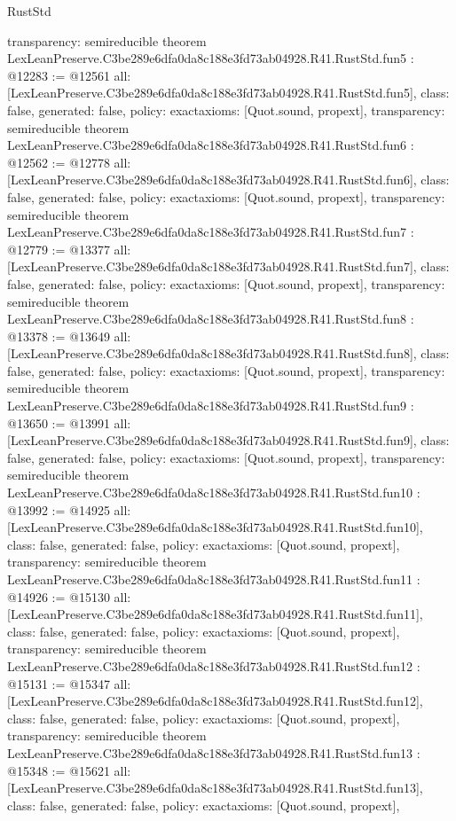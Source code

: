 \begin{lexlean}{RustStd}
\begin{coremodule}
{  transparency: semireducible
}
theorem LexLeanPreserve.C3be289e6dfa0da8c188e3fd73ab04928.R41.RustStd.fun5 : @12283 := @12561 {
  all: [LexLeanPreserve.C3be289e6dfa0da8c188e3fd73ab04928.R41.RustStd.fun5],
  class: false,
  generated: false,
  policy: exact{axioms: [Quot.sound, propext]},
  transparency: semireducible
}
theorem LexLeanPreserve.C3be289e6dfa0da8c188e3fd73ab04928.R41.RustStd.fun6 : @12562 := @12778 {
  all: [LexLeanPreserve.C3be289e6dfa0da8c188e3fd73ab04928.R41.RustStd.fun6],
  class: false,
  generated: false,
  policy: exact{axioms: [Quot.sound, propext]},
  transparency: semireducible
}
theorem LexLeanPreserve.C3be289e6dfa0da8c188e3fd73ab04928.R41.RustStd.fun7 : @12779 := @13377 {
  all: [LexLeanPreserve.C3be289e6dfa0da8c188e3fd73ab04928.R41.RustStd.fun7],
  class: false,
  generated: false,
  policy: exact{axioms: [Quot.sound, propext]},
  transparency: semireducible
}
theorem LexLeanPreserve.C3be289e6dfa0da8c188e3fd73ab04928.R41.RustStd.fun8 : @13378 := @13649 {
  all: [LexLeanPreserve.C3be289e6dfa0da8c188e3fd73ab04928.R41.RustStd.fun8],
  class: false,
  generated: false,
  policy: exact{axioms: [Quot.sound, propext]},
  transparency: semireducible
}
theorem LexLeanPreserve.C3be289e6dfa0da8c188e3fd73ab04928.R41.RustStd.fun9 : @13650 := @13991 {
  all: [LexLeanPreserve.C3be289e6dfa0da8c188e3fd73ab04928.R41.RustStd.fun9],
  class: false,
  generated: false,
  policy: exact{axioms: [Quot.sound, propext]},
  transparency: semireducible
}
theorem LexLeanPreserve.C3be289e6dfa0da8c188e3fd73ab04928.R41.RustStd.fun10 : @13992 := @14925 {
  all: [LexLeanPreserve.C3be289e6dfa0da8c188e3fd73ab04928.R41.RustStd.fun10],
  class: false,
  generated: false,
  policy: exact{axioms: [Quot.sound, propext]},
  transparency: semireducible
}
theorem LexLeanPreserve.C3be289e6dfa0da8c188e3fd73ab04928.R41.RustStd.fun11 : @14926 := @15130 {
  all: [LexLeanPreserve.C3be289e6dfa0da8c188e3fd73ab04928.R41.RustStd.fun11],
  class: false,
  generated: false,
  policy: exact{axioms: [Quot.sound, propext]},
  transparency: semireducible
}
theorem LexLeanPreserve.C3be289e6dfa0da8c188e3fd73ab04928.R41.RustStd.fun12 : @15131 := @15347 {
  all: [LexLeanPreserve.C3be289e6dfa0da8c188e3fd73ab04928.R41.RustStd.fun12],
  class: false,
  generated: false,
  policy: exact{axioms: [Quot.sound, propext]},
  transparency: semireducible
}
theorem LexLeanPreserve.C3be289e6dfa0da8c188e3fd73ab04928.R41.RustStd.fun13 : @15348 := @15621 {
  all: [LexLeanPreserve.C3be289e6dfa0da8c188e3fd73ab04928.R41.RustStd.fun13],
  class: false,
  generated: false,
  policy: exact{axioms: [Quot.sound, propext]},
}
\end{coremodule}
\end{lexlean}
